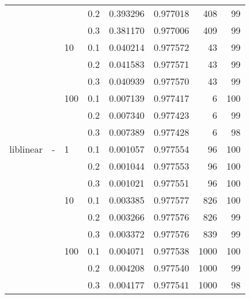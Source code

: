 \begin{table}[H]
\begin{tabular}{llllrrrr}
          &   &     & 0.2 &  0.393296 &  0.977018 &     408 &    99 \\
          &   &     & 0.3 &  0.381170 &  0.977006 &     409 &    99 \\
          &   & 10  & 0.1 &  0.040214 &  0.977572 &      43 &    99 \\
          &   &     & 0.2 &  0.041583 &  0.977571 &      43 &    99 \\
          &   &     & 0.3 &  0.040939 &  0.977570 &      43 &    99 \\
          &   & 100 & 0.1 &  0.007139 &  0.977417 &       6 &   100 \\
          &   &     & 0.2 &  0.007340 &  0.977423 &       6 &    99 \\
          &   &     & 0.3 &  0.007389 &  0.977428 &       6 &    98 \\
liblinear & - & 1   & 0.1 &  0.001057 &  0.977554 &      96 &   100 \\
          &   &     & 0.2 &  0.001044 &  0.977553 &      96 &   100 \\
          &   &     & 0.3 &  0.001021 &  0.977551 &      96 &   100 \\
          &   & 10  & 0.1 &  0.003385 &  0.977577 &     826 &   100 \\
          &   &     & 0.2 &  0.003266 &  0.977576 &     826 &    99 \\
          &   &     & 0.3 &  0.003372 &  0.977576 &     839 &    99 \\
          &   & 100 & 0.1 &  0.004071 &  0.977538 &    1000 &   100 \\
          &   &     & 0.2 &  0.004208 &  0.977540 &    1000 &    99 \\
          &   &     & 0.3 &  0.004177 &  0.977541 &    1000 &    98 \\
\bottomrule
\end{tabular}
\end{table}
